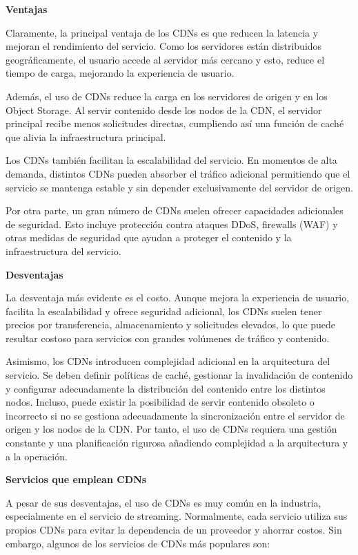 \textbf{Ventajas}

Claramente, la principal ventaja de los CDNs es que reducen la latencia y mejoran el rendimiento del servicio. Como los servidores están distribuidos geográficamente, el usuario accede al servidor más cercano y esto, reduce el tiempo de carga, mejorando la experiencia de usuario.

Además, el uso de CDNs reduce la carga en los servidores de origen y en los Object Storage. Al servir contenido desde los nodos de la CDN, el servidor principal recibe menos solicitudes directas, cumpliendo así una función de caché que alivia la infraestructura principal.

Los CDNs también facilitan la escalabilidad del servicio. En momentos de alta demanda, distintos CDNs pueden absorber el tráfico adicional permitiendo que el servicio se mantenga estable y sin depender exclusivamente del servidor de origen. 

Por otra parte, un gran número de CDNs suelen ofrecer capacidades adicionales de seguridad. Esto incluye protección contra ataques DDoS, firewalls (WAF) y otras medidas de seguridad que ayudan a proteger el contenido y la infraestructura del servicio.

\textbf{Desventajas}

La desventaja más evidente es el costo. Aunque mejora la experiencia de usuario, facilita la escalabilidad y ofrece seguridad adicional, los CDNs suelen tener precios por transferencia, almacenamiento y solicitudes elevados, lo que puede resultar costoso para servicios con grandes volúmenes de tráfico y contenido.

Asimismo, los CDNs introducen complejidad adicional en la arquitectura del servicio. Se deben definir políticas de caché, gestionar la invalidación de contenido y configurar adecuadamente la distribución del contenido entre los distintos nodos. Incluso, puede existir la posibilidad de servir contenido obsoleto o incorrecto si no se gestiona adecuadamente la sincronización entre el servidor de origen y los nodos de la CDN. Por tanto, el uso de CDNs requiera una gestión constante y una planificación rigurosa añadiendo complejidad a la arquitectura y a la operación. 

\textbf{Servicios que emplean CDNs}

A pesar de sus desventajas, el uso de CDNs es muy común en la industria, especialmente en el servicio de streaming. Normalmente, cada servicio utiliza sus propios CDNs para evitar la dependencia de un proveedor y ahorrar costos. Sin embargo, algunos de los servicios de CDNs más populares son:

